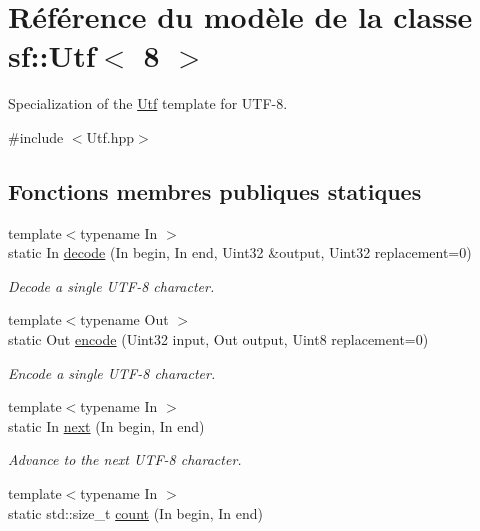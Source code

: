 \hypertarget{classsf_1_1Utf_3_018_01_4}{}\section{Référence du modèle de la classe sf\+:\+:Utf$<$ 8 $>$}
\label{classsf_1_1Utf_3_018_01_4}


Specialization of the \hyperlink{classsf_1_1Utf}{Utf} template for U\+T\+F-\/8.  




{\ttfamily \#include $<$Utf.\+hpp$>$}

\subsection*{Fonctions membres publiques statiques}
\begin{DoxyCompactItemize}
\item 
{\footnotesize template$<$typename In $>$ }\\static In \hyperlink{classsf_1_1Utf_3_018_01_4_a59d4e8d5832961e62b263d308b72bf4b}{decode} (In begin, In end, Uint32 \&output, Uint32 replacement=0)
\begin{DoxyCompactList}\small\item\em Decode a single U\+T\+F-\/8 character. \end{DoxyCompactList}\item 
{\footnotesize template$<$typename Out $>$ }\\static Out \hyperlink{classsf_1_1Utf_3_018_01_4_a5fbc6b5a996f52e9e4a14633d0d71847}{encode} (Uint32 input, Out output, Uint8 replacement=0)
\begin{DoxyCompactList}\small\item\em Encode a single U\+T\+F-\/8 character. \end{DoxyCompactList}\item 
{\footnotesize template$<$typename In $>$ }\\static In \hyperlink{classsf_1_1Utf_3_018_01_4_a0365a0b38700baa161843563d083edf6}{next} (In begin, In end)
\begin{DoxyCompactList}\small\item\em Advance to the next U\+T\+F-\/8 character. \end{DoxyCompactList}\item 
{\footnotesize template$<$typename In $>$ }\\static std\+::size\+\_\+t \hyperlink{classsf_1_1Utf_3_018_01_4_af1f15d9a772ee887be39e97431e15d32}{count} (In begin, In end)

\end{DoxyCompactItemize}
